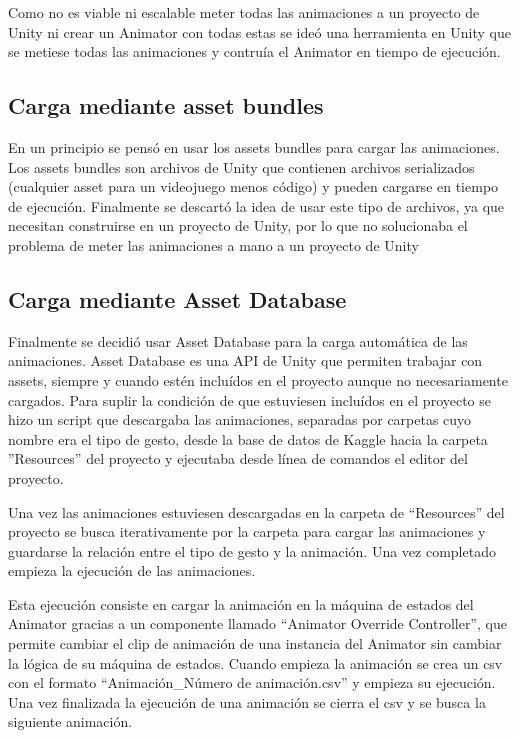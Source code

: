 Como no es viable ni escalable meter todas las animaciones a un proyecto de Unity ni crear un \gls{Animator} con todas estas se ideó una herramienta en Unity que se metiese todas las animaciones y contruía el Animator en tiempo de ejecución.

\subsection{Carga mediante asset bundles}
En un principio se pensó en usar los assets bundles para cargar las animaciones.
Los assets bundles son archivos de Unity que contienen archivos serializados (cualquier asset para un videojuego menos código) y pueden cargarse en tiempo de ejecución.
Finalmente se descartó la idea de usar este tipo de archivos, ya que necesitan construirse en un proyecto de Unity, por lo que no solucionaba el problema de meter las animaciones a mano a un proyecto de Unity

\subsection{Carga mediante Asset Database}
Finalmente se decidió usar Asset Database para la carga automática de las animaciones.
Asset Database es una API de Unity que permiten trabajar con assets, siempre y cuando estén incluídos en el proyecto aunque no necesariamente cargados.
Para suplir la condición de que estuviesen incluídos en el proyecto se hizo un script que descargaba las animaciones, separadas por carpetas cuyo nombre era el tipo de gesto, desde la base de datos de Kaggle hacia la carpeta ''Resources'' del proyecto y ejecutaba desde línea de comandos el editor del proyecto.

Una vez las animaciones estuviesen descargadas en la carpeta de ``Resources'' del proyecto se busca iterativamente por la carpeta para cargar las animaciones y guardarse la relación entre el tipo de gesto y la animación.
Una vez completado empieza la ejecución de las animaciones.

Esta ejecución consiste en cargar la animación en la máquina de estados del \gls{Animator} gracias a un componente llamado ``Animator Override Controller'', que permite cambiar el clip de animación de una instancia del \gls{Animator} sin cambiar la lógica de su máquina de estados.
Cuando empieza la animación se crea un \gls{csv} con el formato ``Animación\_Número de animación.csv'' y empieza su ejecución.
Una vez finalizada la ejecución de una animación se cierra el \gls{csv} y se busca la siguiente animación.

